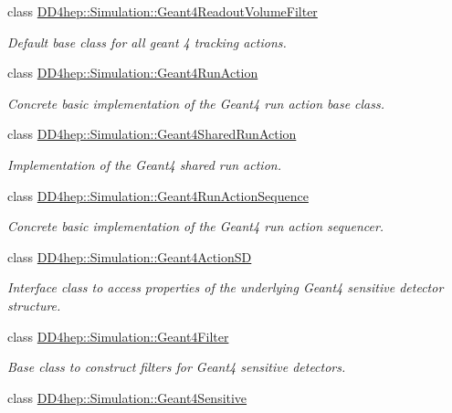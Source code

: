 \begin{DoxyCompactItemize}
class \hyperlink{class_d_d4hep_1_1_simulation_1_1_geant4_readout_volume_filter}{D\+D4hep\+::\+Simulation\+::\+Geant4\+Readout\+Volume\+Filter}
\begin{DoxyCompactList}\small\item\em Default base class for all geant 4 tracking actions. \end{DoxyCompactList}\item 
class \hyperlink{class_d_d4hep_1_1_simulation_1_1_geant4_run_action}{D\+D4hep\+::\+Simulation\+::\+Geant4\+Run\+Action}
\begin{DoxyCompactList}\small\item\em Concrete basic implementation of the Geant4 run action base class. \end{DoxyCompactList}\item 
class \hyperlink{class_d_d4hep_1_1_simulation_1_1_geant4_shared_run_action}{D\+D4hep\+::\+Simulation\+::\+Geant4\+Shared\+Run\+Action}
\begin{DoxyCompactList}\small\item\em Implementation of the Geant4 shared run action. \end{DoxyCompactList}\item 
class \hyperlink{class_d_d4hep_1_1_simulation_1_1_geant4_run_action_sequence}{D\+D4hep\+::\+Simulation\+::\+Geant4\+Run\+Action\+Sequence}
\begin{DoxyCompactList}\small\item\em Concrete basic implementation of the Geant4 run action sequencer. \end{DoxyCompactList}\item 
class \hyperlink{class_d_d4hep_1_1_simulation_1_1_geant4_action_s_d}{D\+D4hep\+::\+Simulation\+::\+Geant4\+Action\+SD}
\begin{DoxyCompactList}\small\item\em Interface class to access properties of the underlying Geant4 sensitive detector structure. \end{DoxyCompactList}\item 
class \hyperlink{class_d_d4hep_1_1_simulation_1_1_geant4_filter}{D\+D4hep\+::\+Simulation\+::\+Geant4\+Filter}
\begin{DoxyCompactList}\small\item\em Base class to construct filters for Geant4 sensitive detectors. \end{DoxyCompactList}\item 
class \hyperlink{class_d_d4hep_1_1_simulation_1_1_geant4_sensitive}{D\+D4hep\+::\+Simulation\+::\+Geant4\+Sensitive}

\end{DoxyCompactItemize}
